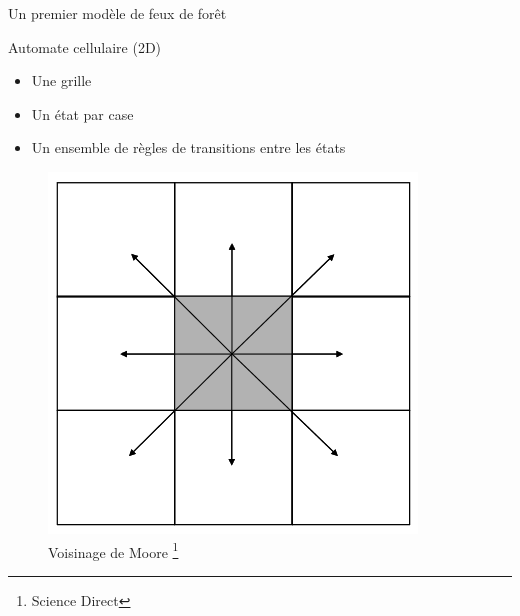 \documentclass{beamer}
\begin{document}
\begin{frame}{Un premier modèle de feux de forêt \hyperlink{jump}{\beamerbutton{ }} \hypertarget{3}{\beamerbutton{ }}}
    \begin{block}{Automate cellulaire (2D)}
        \begin{itemize}
            \item Une grille
            \item Un état par case
            \item Un ensemble de règles de transitions entre les états
        \end{itemize}
    \end{block}

    \begin{figure}
        \centering
        \includegraphics[width=0.25\linewidth]{pictures/moore.png}
        \caption{Voisinage de Moore {\footnote{Science Direct}}}
        \label{fig:enter-label}
    \end{figure}
\end{frame}
\end{document}
